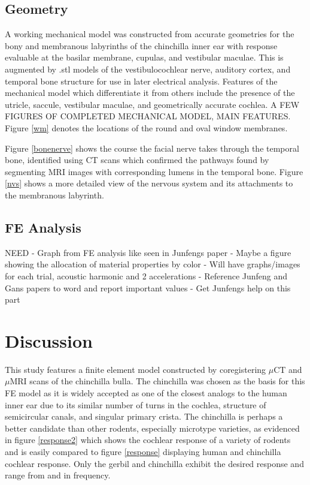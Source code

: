 \documentclass[12pt]{article}
\begin{document}
\subsection{Geometry}
A working mechanical model was constructed from accurate geometries for the bony and membranous labyrinths of the chinchilla inner ear with response evaluable at the basilar membrane, cupulas, and vestibular maculae. This is augmented by .stl models of the vestibulocochlear nerve, auditory cortex, and temporal bone structure for use in later electrical analysis. Features of the mechanical model which differentiate it from others include the presence of the utricle, saccule, vestibular maculae, and geometrically accurate cochlea. A FEW FIGURES OF COMPLETED MECHANICAL MODEL, MAIN FEATURES. Figure \ref{wm} denotes the locations of the round and oval window membranes.


Figure \ref{bonenerve} shows the course the facial nerve takes through the temporal bone, identified using CT scans which confirmed the pathways found by segmenting MRI images with corresponding lumens in the temporal bone. Figure \ref{nvs} shows a more detailed view of the nervous system and its attachments to the membranous labyrinth.


\subsection{FE Analysis}
NEED \newline - Graph from FE analysis like seen in Junfengs paper
- Maybe a figure showing the allocation of material properties by color
- Will have graphs/images for each trial, acoustic harmonic and 2 accelerations
- Reference Junfeng and Gans papers to word and report important values
- Get Junfengs help on this part



\section{Discussion}\label{discussion}
This study features a finite element model constructed by coregistering $\mu$CT and $\mu$MRI scans of the chinchilla bulla. The chinchilla was chosen as the basis for this FE model as it is widely accepted as one of the closest analogs to the human inner ear due to its similar number of turns in the cochlea, structure of semicircular canals, and singular primary crista. \cite{trevino:chinchmodel} The chinchilla is perhaps a better candidate than other rodents, especially microtype varieties, as evidenced in figure \ref{response2} which shows the cochlear response of a variety of rodents and is easily compared to figure \ref{response} displaying human and chinchilla cochlear response. Only the gerbil and chinchilla exhibit the desired response and range from and in frequency. \cite{mason}
\end{document}
